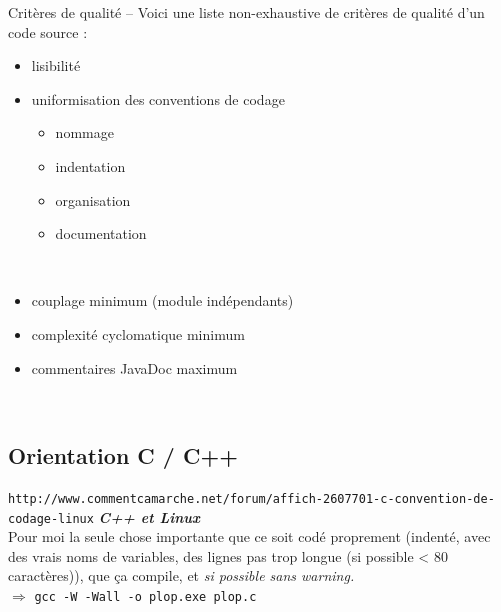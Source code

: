 \documentclass[11pt,twoside,a4paper]{article}
\begin{document}
Crit{\`e}res de qualit{\'e} -- Voici une liste non-exhaustive de crit{\`e}res de qualit{\'e} d'un code source :
\begin{itemize}
	\item[] lisibilit{\'e}
    \item[] uniformisation des conventions de codage
	\begin{itemize}
		\item[] nommage
		\item[] indentation
    	\item[] organisation
    	\item[] documentation
	\end{itemize}~\\
    \item[] couplage minimum (module ind{\'e}pendants)
    \item[] complexit{\'e} cyclomatique minimum
    \item[] commentaires JavaDoc maximum
\end{itemize}~\\

\clearpage

\subsection{Orientation C / C++}

\texttt{http://www.commentcamarche.net/forum/affich-2607701-c-convention-de-codage-linux} \emph{\textbf{C++ et Linux}}~\\
	Pour moi la seule chose importante que ce soit cod{\'e} proprement (indent{\'e}, avec des vrais noms de variables, des lignes pas trop longue (si possible < 80 caract{\`e}res)), que \c{c}a compile, et \emph{si possible sans warning. }~\\
	
	$\Rightarrow$ \texttt{gcc -W -Wall -o plop.exe plop.c}~\\
	
\end{document}
